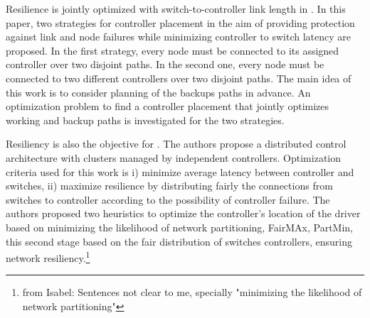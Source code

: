 \documentclass{IEEEtran}
\newcommand\fia[1]{{\color{red}\footnote{\color{red}from Isabel: #1}}} %
\newcommand\mia[1]{{\color{red}#1}}%
\newcommand\delia[1]{{\tiny{\color{red}#1}}} %
\begin{document}
Resilience is jointly optimized with switch-to-controller link length in \cite{ViMa16}. In this paper, two strategies for controller placement in the aim of providing protection against link and node failures while minimizing controller to switch latency are proposed. In the first strategy, every node must be connected to its assigned controller over two disjoint paths. In the second one, every node must be connected to two different controllers over two disjoint paths. The main idea of this work is to consider planning of the backups paths in advance. An optimization problem to find a controller placement that jointly optimizes working and backup paths is investigated for the two strategies. %

Resiliency is also the objective for \cite{MaDu16}. The authors propose a distributed control architecture with clusters managed by independent controllers. Optimization criteria used for this work is i) minimize average latency between controller and switches, ii) maximize resilience by distributing fairly the connections from switches to controller according to the possibility of controller failure. The authors proposed two heuristics to optimize the \mia{controller's} location \delia{of the driver} based on minimizing the likelihood of network partitioning, FairMAx, PartMin, this second stage based on the fair distribution of switches controllers, ensuring network resiliency.\fia{Sentences not clear to me, specially "minimizing the likelihood of network partitioning"}  %
\end{document}
